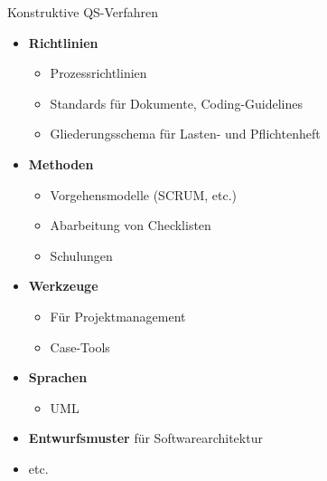 \begin{bonus}{Konstruktive QS-Verfahren}
    \begin{itemize}
        \item \textbf{Richtlinien}
              \begin{itemize}
                  \item Prozessrichtlinien
                  \item Standards für Dokumente, Coding-Guidelines
                  \item Gliederungsschema für Lasten- und Pflichtenheft
              \end{itemize}
        \item \textbf{Methoden}
              \begin{itemize}
                  \item Vorgehensmodelle (SCRUM, etc.)
                  \item Abarbeitung von Checklisten
                  \item Schulungen
              \end{itemize}
        \item \textbf{Werkzeuge}
              \begin{itemize}
                  \item Für Projektmanagement
                  \item Case-Tools
              \end{itemize}
        \item \textbf{Sprachen}
              \begin{itemize}
                  \item UML
              \end{itemize}
        \item \textbf{Entwurfsmuster} für Softwarearchitektur
        \item etc.
    \end{itemize}
\end{bonus}

